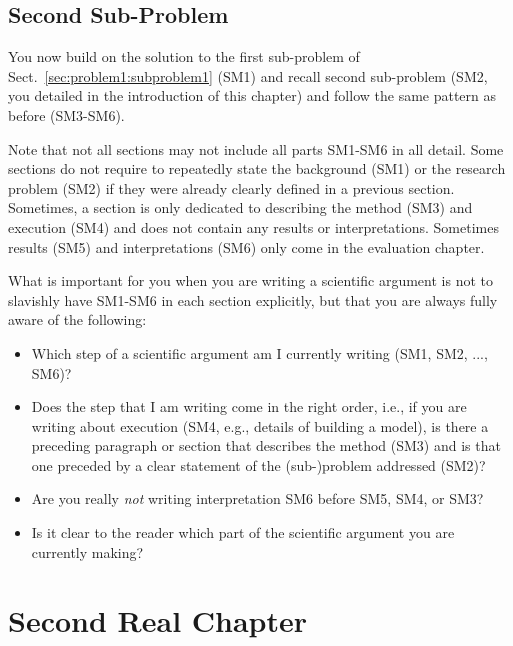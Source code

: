 \documentclass[12pt,a4paper,footinclude=true,twoside,headinclude=true]{report}
\begin{document}
\section{Second Sub-Problem}\label{sec:problem1:subproblem2}

You now build on the solution to the first sub-problem of Sect.~\ref{sec:problem1:subproblem1} (SM1) and recall second sub-problem (SM2, you detailed in the introduction of this chapter) and follow the same pattern as before (SM3-SM6). 

Note that not all sections may not include all parts SM1-SM6 in all detail. Some sections do not require to repeatedly state the background (SM1) or the research problem (SM2) if they were already clearly defined in a previous section. Sometimes, a section is only dedicated to describing the method (SM3) and execution (SM4) and does not contain any results or interpretations. Sometimes results (SM5) and interpretations (SM6) only come in the evaluation chapter. 

What is important for you when you are writing a scientific argument is not to slavishly have SM1-SM6 in each section explicitly, but that you are always fully aware of the following:
%
\begin{itemize}
    \item Which step of a scientific argument am I currently writing (SM1, SM2, ..., SM6)?
    \item Does the step that I am writing come in the right order, i.e., if you are writing about execution (SM4, e.g., details of building a model), is there a preceding paragraph or section that describes the method (SM3) and is that one preceded by a clear statement of the (sub-)problem addressed (SM2)?
    \item Are you really \emph{not} writing interpretation SM6 before SM5, SM4, or SM3?
    \item Is it clear to the reader which part of the scientific argument you are currently making?
\end{itemize}

\chapter{Second Real Chapter}\label{sec:sub-problem2}
\end{document}
